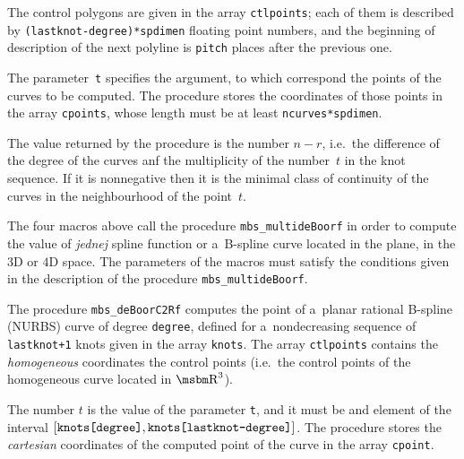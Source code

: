 The control polygons are given in the array \texttt{ctlpoints}; each of them is
described by \texttt{(lastknot-degree)*spdimen} floating point numbers,
and the beginning of description of the next polyline is
\texttt{pitch} places after the previous one.

The parameter~\texttt{t} specifies the argument, to which correspond the points
of the curves to be computed. The procedure stores the coordinates of those
points in the array \texttt{cpoints}, whose length must be at least
\texttt{ncurves*spdimen}.

The value returned by the procedure is the number $n-r$, i.e.\ the difference
of the degree of the curves anf the multiplicity of the number~$t$ in the
knot sequence. If it is nonnegative then it is the minimal
class of continuity of the curves in the neighbourhood of the
point~$t$.

\vspace{\bigskipamount}
The four macros above call the procedure \texttt{mbs\_multideBoorf} in order to
compute the value of \emph{jednej} spline function or a~B-spline curve located
in the plane, in the $3$D or $4$D space. The parameters of the macros
must satisfy the conditions given in the description of the procedure
\texttt{mbs\_multideBoorf}.

\vspace{\bigskipamount}
\begin{sloppypar}
The procedure \texttt{mbs\_deBoorC2Rf} computes the point of a~planar
rational B-spline (NURBS) curve of degree \texttt{degree}, defined for
a~nondecreasing sequence of \texttt{lastknot+1} knots given in the array
\texttt{knots}. The array \texttt{ctlpoints} contains the \emph{homogeneous}
coordinates the control points (i.e.\ the control points of the homogeneous curve
located in $\R^3$).

The number $t$ is the value of the parameter \texttt{t}, and it must be
and element of the interval
$[\mbox{\texttt{knots[degree]}},\mbox{\texttt{knots[lastknot-degree]}}]$.
The procedure stores the \emph{cartesian} coordinates of the computed point
of the curve in the array \texttt{cpoint}.
\end{sloppypar}

